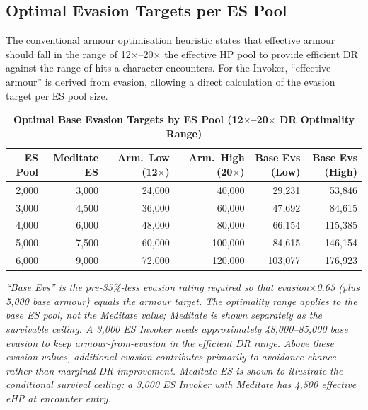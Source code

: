 \documentclass[12pt, letterpaper]{article}
\begin{document}
\subsection*{Optimal Evasion Targets per ES Pool}

The conventional armour optimisation heuristic states that effective armour should fall in the range of 12$\times$--20$\times$ the effective HP pool to provide efficient DR against the range of hits a character encounters. For the Invoker, ``effective armour'' is derived from evasion, allowing a direct calculation of the evasion target per ES pool size.

\begin{table}[htbp]
\centering
\caption{\textbf{Optimal Base Evasion Targets by ES Pool (12$\times$--20$\times$ DR Optimality Range)}}
\begin{tabular}{rrrrrr}
\toprule
\textbf{ES Pool} & \textbf{Meditate ES} & \textbf{Arm.\ Low (12$\times$)} & \textbf{Arm.\ High (20$\times$)} & \textbf{Base Evs (Low)} & \textbf{Base Evs (High)} \\
\midrule
\rowcolor{rowalt} 2{,}000 & 3{,}000 & 24{,}000 & 40{,}000 & 29{,}231 & 53{,}846 \\
3{,}000 & 4{,}500 & 36{,}000 & 60{,}000 & 47{,}692 & 84{,}615 \\
\rowcolor{rowalt} 4{,}000 & 6{,}000 & 48{,}000 & 80{,}000 & 66{,}154 & 115{,}385 \\
5{,}000 & 7{,}500 & 60{,}000 & 100{,}000 & 84{,}615 & 146{,}154 \\
\rowcolor{rowalt} 6{,}000 & 9{,}000 & 72{,}000 & 120{,}000 & 103{,}077 & 176{,}923 \\
\bottomrule
\end{tabular}
\smallskip
\begin{minipage}{\linewidth}
\small\textit{``Base Evs'' is the pre-35\%-less evasion rating required so that evasion$\times$0.65 (plus 5{,}000 base armour) equals the armour target. The optimality range applies to the \textit{base} ES pool, not the Meditate value; Meditate is shown separately as the survivable ceiling. A 3{,}000 ES Invoker needs approximately 48{,}000--85{,}000 base evasion to keep armour-from-evasion in the efficient DR range. Above these evasion values, additional evasion contributes primarily to avoidance chance rather than marginal DR improvement. Meditate ES is shown to illustrate the conditional survival ceiling: a 3{,}000 ES Invoker with Meditate has 4{,}500 effective eHP at encounter entry.}
\end{minipage}
\end{table}
\end{document}
